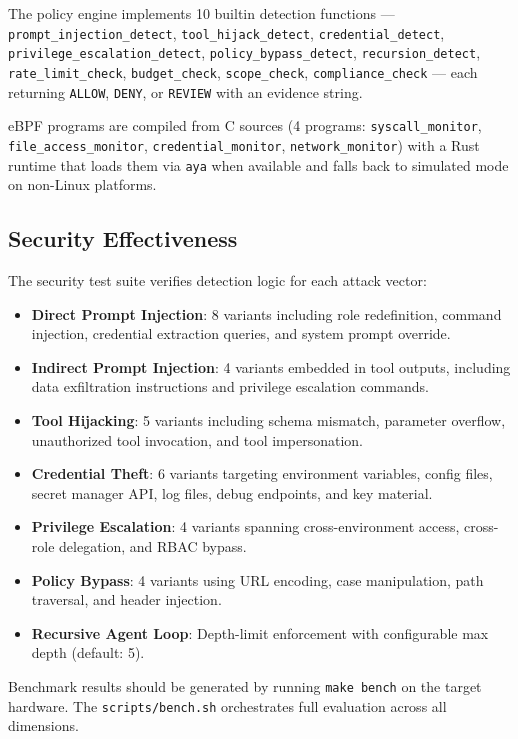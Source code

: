 \documentclass[runningheads]{llncs}
\begin{document}
The policy engine implements 10 builtin detection functions --- \texttt{prompt\_injection\_detect}, \texttt{tool\_hijack\_detect}, \texttt{credential\_detect}, \texttt{privilege\_escalation\_detect}, \texttt{policy\_bypass\_detect}, \texttt{recursion\_detect}, \texttt{rate\_limit\_check}, \texttt{budget\_check}, \texttt{scope\_check}, \texttt{compliance\_check} --- each returning \texttt{ALLOW}, \texttt{DENY}, or \texttt{REVIEW} with an evidence string.

eBPF programs are compiled from C sources (4 programs: \texttt{syscall\_monitor}, \texttt{file\_access\_monitor}, \texttt{credential\_monitor}, \texttt{network\_monitor}) with a Rust runtime that loads them via \texttt{aya} when available and falls back to simulated mode on non-Linux platforms.

\subsection{Security Effectiveness}

The security test suite verifies detection logic for each attack vector:

\begin{itemize}
\item \textbf{Direct Prompt Injection}: 8 variants including role redefinition, command injection, credential extraction queries, and system prompt override.
\item \textbf{Indirect Prompt Injection}: 4 variants embedded in tool outputs, including data exfiltration instructions and privilege escalation commands.
\item \textbf{Tool Hijacking}: 5 variants including schema mismatch, parameter overflow, unauthorized tool invocation, and tool impersonation.
\item \textbf{Credential Theft}: 6 variants targeting environment variables, config files, secret manager API, log files, debug endpoints, and key material.
\item \textbf{Privilege Escalation}: 4 variants spanning cross-environment access, cross-role delegation, and RBAC bypass.
\item \textbf{Policy Bypass}: 4 variants using URL encoding, case manipulation, path traversal, and header injection.
\item \textbf{Recursive Agent Loop}: Depth-limit enforcement with configurable max depth (default: 5).
\end{itemize}

Benchmark results should be generated by running \texttt{make bench} on the target hardware. The \texttt{scripts/bench.sh} orchestrates full evaluation across all dimensions.
\end{document}
